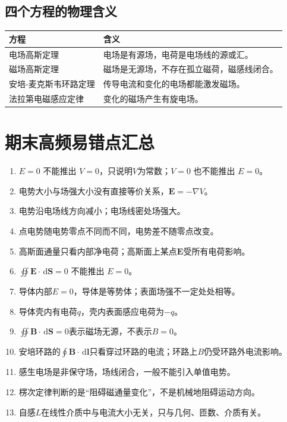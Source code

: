 \documentclass[UTF8,zihao=-4]{ctexart}
\newcommand{\dd}{\,\mathrm d}
\newcommand{\ve}[1]{\bm{#1}}
\newcommand{\E}{\ve E}
\newcommand{\B}{\ve B}
\newcommand{\dl}{\dd\ve l}
\newcommand{\dS}{\dd\ve S}
\newcommand{\grad}{\nabla}
\begin{document}
\subsection{四个方程的物理含义}

\begin{center}
\begin{tabularx}{\textwidth}{>{\raggedright\arraybackslash}p{}X}
\toprule
\textbf{方程} & \textbf{含义} \\
\midrule
电场高斯定理 & 电场是有源场，电荷是电场线的源或汇。 \\
磁场高斯定理 & 磁场是无源场，不存在孤立磁荷，磁感线闭合。 \\
安培-麦克斯韦环路定理 & 传导电流和变化的电场都能激发磁场。 \\
法拉第电磁感应定律 & 变化的磁场产生有旋电场。 \\
\bottomrule
\end{tabularx}
\end{center}

\section{期末高频易错点汇总}

\begin{warnbox}[一页核心易错点]
\begin{enumerate}
  \item \(E=0\) 不能推出 \(V=0\)，只说明\(V\)为常数；\(V=0\) 也不能推出 \(E=0\)。
  \item 电势大小与场强大小没有直接等价关系，\(\E=-\grad V\)。
  \item 电势沿电场线方向减小；电场线密处场强大。
  \item 点电势随电势零点不同而不同，电势差不随零点改变。
  \item 高斯面通量只看内部净电荷；高斯面上某点\(\E\)受所有电荷影响。
  \item \(\oiint\E\cdot\dS=0\) 不能推出 \(E=0\)。
  \item 导体内部\(E=0\)，导体是等势体；表面场强不一定处处相等。
  \item 导体壳内有电荷\(q\)，壳内表面感应电荷为\(-q\)。
  \item \(\oiint\B\cdot\dS=0\)表示磁场无源，不表示\(B=0\)。
  \item 安培环路的\(\oint\B\cdot\dl\)只看穿过环路的电流；环路上\(B\)仍受环路外电流影响。
  \item 感生电场是非保守场，场线闭合，一般不能引入单值电势。
  \item 楞次定律判断的是“阻碍磁通量变化”，不是机械地阻碍运动方向。
  \item 自感\(L\)在线性介质中与电流大小无关，只与几何、匝数、介质有关。
\end{enumerate}
\end{warnbox}
\end{document}
